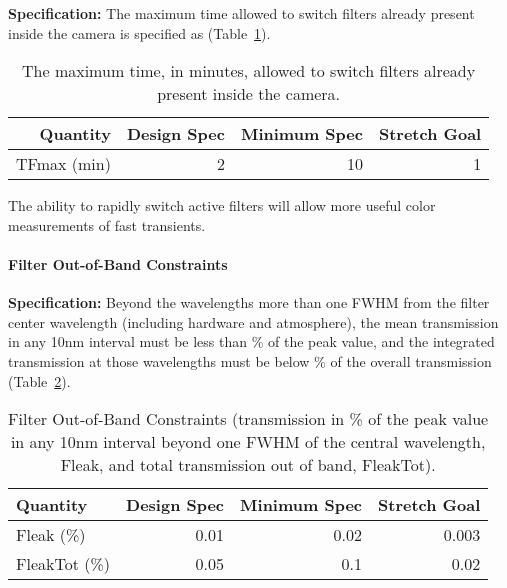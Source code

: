 \newpage
{\bf Specification:} The maximum time allowed to switch filters already
present inside the camera is specified as
(Table~\ref{Tfilterswitch}).

\begin{table}[h]
\begin{tabular}{|r|r|r|r|}
\hline
     Quantity     & Design Spec & Minimum Spec  & Stretch Goal      \\
\hline
 TFmax (min)      &      2      &      10       &       1           \\
\hline
\end{tabular}
\caption{The maximum time, in minutes, allowed to switch filters already
present inside the camera.}
\label{Tfilterswitch}
\end{table}

The ability to rapidly switch active filters will allow more useful color
measurements of fast transients.


\paragraph{Filter Out-of-Band Constraints\\}

{\bf Specification:} Beyond the wavelengths more than one FWHM from the filter
center wavelength (including hardware and atmosphere), the mean transmission
in any 10nm interval must be less than
\% of the peak value, and the integrated transmission at those wavelengths
must be below
\% of the overall transmission (Table~\ref{Tleaks}).

\begin{table}[h]
\begin{tabular}{|l|r|r|r|}
\hline
Quantity    & Design Spec & Minimum Spec & Stretch Goal        \\
\hline
 Fleak (\%)      &      0.01      &      0.02   &       0.003     \\
 FleakTot (\%)   &      0.05      &      0.1    &       0.02      \\
\hline
\end{tabular}
\caption{Filter Out-of-Band Constraints (transmission in \% of the peak
value in any 10nm interval beyond one FWHM of the central wavelength,
Fleak, and total transmission out of band, FleakTot).}
\label{Tleaks}
\end{table}

